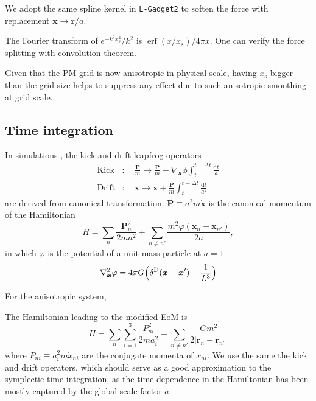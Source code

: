 \documentclass[a4paper,11pt]{article}
\DeclareMathOperator{\deltaD}{\delta^\mathrm{D}}
\DeclareMathOperator{\erf}{erf}
\renewcommand{\d}{\mathrm{d}}
\newcommand{\vr}{{\bm r}}
\newcommand{\vx}{{\bm x}}
\newcommand{\vP}{{\bm P}}
\newcommand{\xs}{x_\mathrm{s}}
\begin{document}
We adopt the same spline kernel in \texttt{L-Gadget2} to soften the force
with replacement $\vx \to \vr / a$.



The Fourier transform of $e^{- k^2 x_s^2} / k^2$ is $\erf(x / x_s) / 4\pi x$.
One can verify the force splitting with convolution theorem.


Given that the PM grid is now anisotropic in physical scale, having $\xs$
bigger than the grid size helps to suppress any effect due to such anisotropic
smoothing at grid scale.



\subsection{Time integration}
\label{sub:integ}

In simulations \cite{QuinnKatzEtAl97, Springel05}, the kick and drift leapfrog
operators
\begin{align}
    \mathrm{Kick} &: \quad \frac{\vP}m \to \frac{\vP}m
        - \nabla_\vx \phi \int_t^{t+\Delta t} \frac{\d t}a  \\
    \mathrm{Drift} &: \quad \vx \to \vx
        + \frac{\vP}{m} \int_t^{t+\Delta t} \frac{\d t}{a^2}
\end{align}
are derived from canonical transformation.
$\vP \equiv a^2 m \dot \vx$ is the canonical momentum of the Hamiltonian
\begin{equation}
    H = \sum_n \frac{\vP_n^2}{2 m a^2}
    + \sum_{n \neq n'} \frac{m^2 \varphi(\vx_n - \vx_{n'})}{2a},
\end{equation}
in which $\varphi$ is the potential of a unit-mass particle at $a=1$
\begin{equation}
    \nabla_\vx^2 \varphi = 4\pi G \Bigl(\deltaD(\vx-\vx') - \frac1{L^3} \Bigr)
\end{equation}

For the anisotropic system,

The Hamiltonian leading to the modified EoM is
\begin{equation}
    H = \sum_n \sum_{i=1}^3 \frac{P_{ni}^2}{2 m a_i^2}
    + \sum_{n \neq n'} \frac{G m^2}{2 |\vr_n - \vr_{n'}|}
\end{equation}
where $P_{ni}\equiv a_i^2 m \dot x_{ni}$ are the conjugate momenta of $x_{ni}$.
We use the same the kick and drift operators, which should serve as a good approximation
to the symplectic time integration,
as the time dependence in the Hamiltonian has been mostly captured by the global scale
factor $a$.
\end{document}

